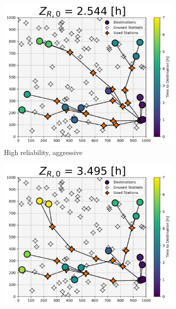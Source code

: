 \begin{figure}[H]
	\centering
	\begin{subfigure}[t]{.5\linewidth}
		\centering\captionsetup{width = .8\linewidth}
		\includegraphics[width = \linewidth]{figs/random_example_high_reliability_aggressive_perceived.png}
		\caption{High reliability, aggressive}
	\end{subfigure}%
	\begin{subfigure}[t]{.5\linewidth}
		\centering\captionsetup{width = .8\linewidth}
		\includegraphics[width = \linewidth]{figs/random_example_high_reliability_cautious_perceived.png}

\end{subfigure}
\end{figure}
